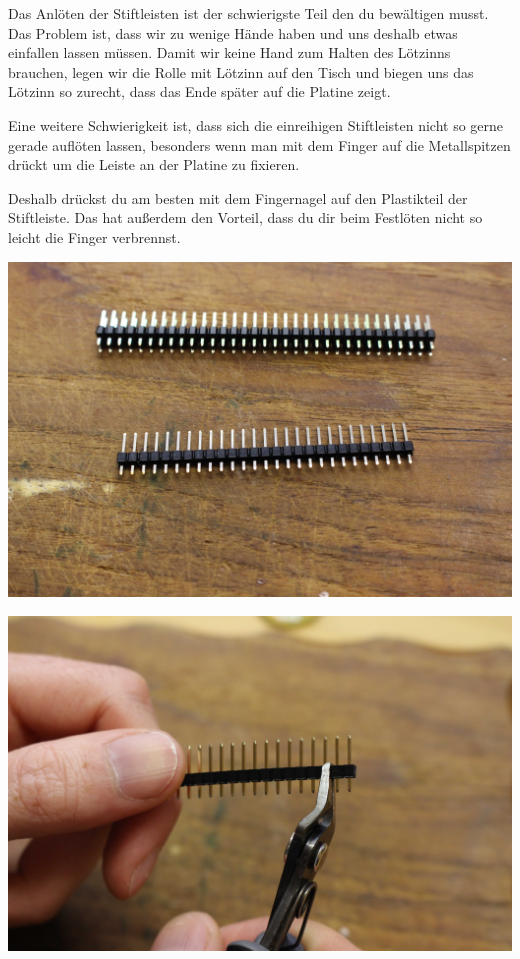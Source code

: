 \documentclass{article}
\begin{document}
Das Anlöten der Stiftleisten ist der schwierigste Teil den du bewältigen musst. Das Problem ist, dass wir zu wenige Hände haben und uns deshalb etwas einfallen lassen müssen. Damit wir keine Hand zum Halten des Lötzinns brauchen, legen wir die Rolle mit Lötzinn auf den Tisch und biegen uns das Lötzinn so zurecht, dass das Ende später auf die Platine zeigt.

Eine weitere Schwierigkeit ist, dass sich die einreihigen Stiftleisten nicht so gerne gerade auflöten lassen, besonders wenn man mit dem Finger auf die Metallspitzen drückt um die Leiste an der Platine zu fixieren.

Deshalb drückst du am besten mit dem Fingernagel auf den Plastikteil der Stiftleiste. Das hat außerdem den Vorteil, dass du dir beim Festlöten nicht so leicht die Finger verbrennst.

\begin{minipage}[b]{0.5\textwidth}
	\includegraphics[width=\textwidth]{Bilder/IMG_5601.JPG}
	\label{fig:}
\end{minipage}
\begin{minipage}[b]{0.5\textwidth}
	\includegraphics[width=\textwidth]{Bilder/IMG_5603.JPG}
	\label{fig:}
\end{minipage}
\end{document}
